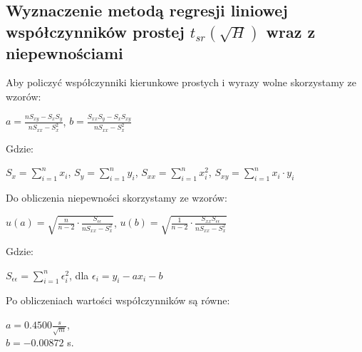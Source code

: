 \documentclass[12pt]{article}
\begin{document}


\subsection*{Wyznaczenie metodą regresji liniowej współczynników prostej
    $t_{sr}(\sqrt{H})$ wraz z niepewnościami}

Aby policzyć współczynniki kierunkowe prostych i wyrazy wolne skorzystamy ze
wzorów:
\begin{flushleft}

    \begin{center}
        $a = \frac{nS_{xy} - S_xS_y}{nS_{xx}-S_x^2}$, $b
            =\frac{S_{xx}S_y-S_xS_{xy}}{nS_{xx}-S_x^2}$
    \end{center}
    Gdzie: \\
    \begin{center}
        $S_x=\displaystyle\sum_{i=1}^{n}x_i$,
        $S_y=\displaystyle\sum_{i=1}^{n}y_i$,
        $S_{xx}=\displaystyle\sum_{i=1}^{n}x_i^2$,
        $S_{xy}=\displaystyle\sum_{i=1}^{n}x_i \cdot y_i$ \\
    \end{center}
\end{flushleft}

\begin{flushleft}
    Do obliczenia niepewności skorzystamy ze wzorów:
    \begin{center}
        $u(a) = \sqrt{\frac{n}{n-2} \cdot
                \frac{S_{\epsilon\epsilon}}{nS_{xx}-S_x^2}}$, $u(b) =
            \sqrt{\frac{1}{n-2} \cdot
            \frac{S_{xx}S_{\epsilon\epsilon}}{nS_{xx}-S_x^2}}$ \\
    \end{center}
    Gdzie: \\
    \begin{center}
        $S_{\epsilon\epsilon}=\displaystyle\sum_{i=1}^{n}\epsilon_i^2$, dla
        $\epsilon_i = y_i - ax_i - b$
    \end{center}

\end{flushleft}

\begin{flushleft}
    Po obliczeniach wartości współczynników są równe:
\end{flushleft}

\begin{center}
    $a = 0.4500\frac{s}{\sqrt{m}}$, \\
    $b = -0.00872$ s.
\end{center}
\end{document}
